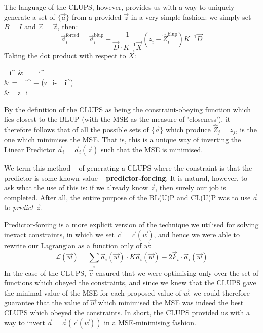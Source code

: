 \documentclass[]{article}
\begin{document}
		The language of the CLUPS, however, provides us with a way to uniquely generate a set of $\{\vec{a}\}$ from a provided $\vec{z}$ in a very simple fashion: we simply set $B = I$ and $\vec{c} = \vec{z}$, then:
		\begin{equation}
			\vec{a}^\text{forced}_i = \vec{a}_i^\text{blup} + \frac{1}{\vec{D}\cdot K^{-1} \vec{X}} \left(z_i - \hat{Z}^\text{blup}_i \right) K^{-1} \vec{D} \label{E:Forcing}
		\end{equation}
		Taking the dot product with respect to $\vec{X}$:
		\begin{spalign}
			_i^ & = _i^ \cdot {}
			\\
			& = _i^ +  (z_i- _i^)
			\\
			&= z_i
		\end{spalign}
		By the definition of the CLUPS as being the constraint-obeying function which lies closest to the BLUP (with the MSE as the measure of 'closeness'), it therefore follows that of all the possible sets of $\{\vec{a}\}$ which produce $\hat{Z}_j = z_j$,  is the one which minimises the MSE. That is, this is a unique way of inverting the Linear Predictor $\vec{a}_i = \vec{a}_i(\vec{z})$ such that the MSE is minimised.

		We term this method -- of generating a CLUPS where the constraint is that the predictor is some known value -- \textbf{predictor-forcing}. It is natural, however, to ask what the use of this is: if we already know $\vec{z}$, then surely our job is completed. After all, the entire purpose of the BL(U)P and CL(U)P was to use $\vec{a}$ to \textit{predict} $\vec{z}$.

		Predictor-forcing is a more explicit version of the technique we utilised for solving inexact constraints, in which we set $\vec{c} = \vec{c}(\vec{w})$, and hence we were able to rewrite our Lagrangian as a function only of $\vec{w}$:
		\begin{equation}
			\mathcal{L}(\vec{w}) = \sum_i \vec{a}_i(\vec{w}) \cdot K \vec{a}_i(\vec{w})- 2 \vec{k}_i \cdot\vec{a}_i(\vec{w})
		\end{equation}
		In the case of the CLUPS, $\vec{c}$ ensured that we were optimising only over the set of functions which obeyed the constraints, and since we knew that the CLUPS gave the minimal value of the MSE for each proposed value of $\vec{w}$, we could therefore guarantee that the value of $\vec{w}$ which minimised the MSE was indeed the best CLUPS which obeyed the constraints. In short, the CLUPS provided us with a way to invert $\vec{a} = \vec{a}(\vec{c}(\vec{w}))$ in a MSE-minimising fashion. 
\end{document}
